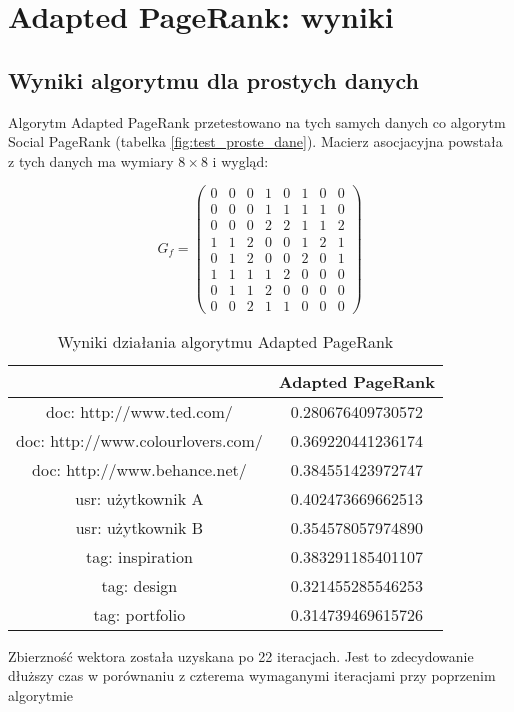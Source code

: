 \section{Adapted PageRank: wyniki}

\subsection{Wyniki algorytmu dla prostych danych}


Algorytm Adapted PageRank przetestowano na tych samych danych co algorytm Social PageRank (tabelka \ref{fig:test_proste_dane}). Macierz asocjacyjna powstała z tych danych ma wymiary $8 \times 8$ i wygląd:

\[
 G_f =
 \begin{pmatrix}
0 & 0 & 0 & 1	 & 0 & 1 & 0 & 0\\
0 & 0 & 0 & 1 & 1 & 1 & 1 & 0\\
0 & 0 & 0 & 2 & 2 & 1 & 1 & 2\\
1 & 1 & 2 & 0 & 0 & 1 & 2 & 1\\
0 & 1 & 2 & 0 & 0 & 2 & 0 & 1\\
1 & 1 & 1 & 1 & 2 & 0 & 0 & 0\\
0 & 1 & 1 & 2 & 0 & 0 & 0 & 0\\
0 & 0 & 2 & 1 & 1 & 0 & 0 & 0
 \end{pmatrix}
\]

\begin{table}[h]
  \centering
    \begin{tabular}{ | c | c | }
\hline
&Adapted PageRank \\
\hline
doc: http://www.ted.com/ & 0.280676409730572 \\
doc: http://www.colourlovers.com/ & 0.369220441236174 \\
doc: http://www.behance.net/ & 0.384551423972747 \\
\hline
usr: użytkownik A & 0.402473669662513 \\
usr: użytkownik B & 0.354578057974890 \\
\hline
tag: inspiration & 0.383291185401107 \\
tag: design & 0.321455285546253 \\ 
tag: portfolio	 & 0.314739469615726 \\
\hline
\end{tabular}
  \caption{Wyniki działania algorytmu Adapted PageRank}
  \label{fig:adapted_page_simple_wyniki}
\end{table}

Zbierzność wektora została uzyskana po 22 iteracjach. Jest to zdecydowanie dłuższy czas w porównaniu z czterema wymaganymi iteracjami przy poprzenim algorytmie


